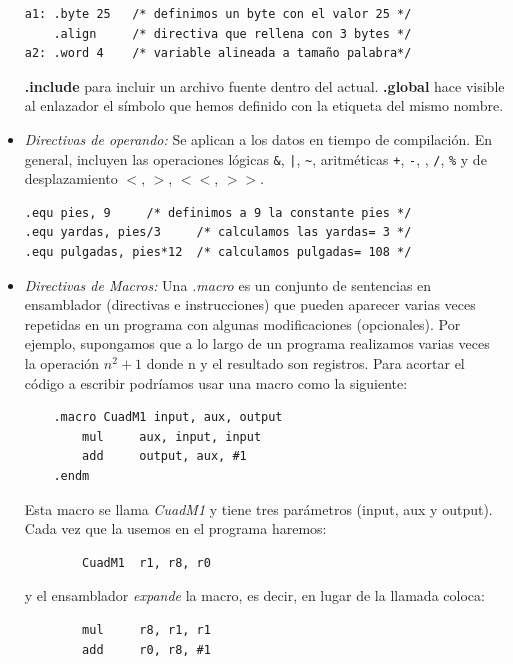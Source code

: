 \begin{itemize}
\begin{lstlisting}
a1: .byte 25   /* definimos un byte con el valor 25 */
    .align     /* directiva que rellena con 3 bytes */
a2: .word 4    /* variable alineada a tamaño palabra*/
\end{lstlisting}

        \textbf{.include} para incluir un archivo fuente dentro del actual.
        \textbf{.global} hace visible al enlazador el símbolo que hemos
        definido con la etiqueta del mismo nombre.

     \item \textit{Directivas de operando:} Se aplican a los datos en
        tiempo de compilación. En general, incluyen las operaciones lógicas
        {\tt \&}, {\tt |}, {\tt \~{}}, aritméticas {\tt +}, {\tt -},
        {\tt *}, {\tt /}, {\tt \%} y de desplazamiento
        {\tt $<$}, {\tt $>$}, {\tt $<<$}, {\tt $>>$}.

\begin{lstlisting}
.equ pies, 9     /* definimos a 9 la constante pies */
.equ yardas, pies/3     /* calculamos las yardas= 3 */
.equ pulgadas, pies*12  /* calculamos pulgadas= 108 */
\end{lstlisting}

     \item \textit{Directivas de Macros:} Una {\it .macro} es un
conjunto de sentencias en ensamblador (directivas e instrucciones) que
pueden aparecer varias veces repetidas en un programa con algunas
modificaciones (opcionales). Por ejemplo, supongamos que a lo largo de
un programa realizamos varias veces la operación $n^{2}+1$ donde n y el
resultado son registros. Para acortar el código a escribir
podríamos usar una macro como la siguiente:

\begin{lstlisting}
    .macro CuadM1 input, aux, output
        mul     aux, input, input
        add     output, aux, #1
    .endm    
\end{lstlisting}

Esta macro se llama {\it CuadM1} y tiene tres parámetros (input, aux y output).
Cada vez que la usemos en el programa haremos:

\begin{lstlisting}
        CuadM1  r1, r8, r0
\end{lstlisting}

\noindent y el ensamblador {\it expande} la macro, es decir, en lugar de
la llamada coloca:

\begin{lstlisting}
        mul     r8, r1, r1
        add     r0, r8, #1
\end{lstlisting}


\end{itemize}
